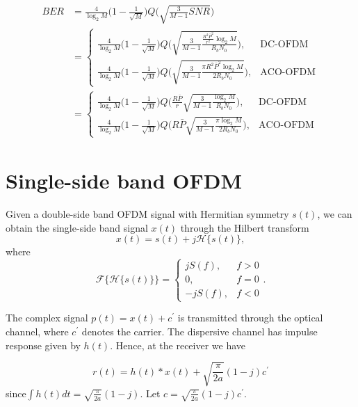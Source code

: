 \documentclass[a4paper]{article}
\begin{document}
\begin{align} \nonumber
BER &= \frac{4}{\log_2M}\bigg(1 - \frac{1}{\sqrt{M}}\bigg)Q\bigg(\sqrt{\frac{3}{M-1}SNR}\bigg) \\ 
& =\begin{cases}
\frac{4}{\log_2M}\bigg(1 - \frac{1}{\sqrt{M}}\bigg)Q\bigg(\sqrt{\frac{3}{M-1}\frac{\frac{R^2\bar{P}^2}{r^2}\log_2M}{R_bN_0}}\bigg), &\text{DC-OFDM} \\
\frac{4}{\log_2M}\bigg(1 - \frac{1}{\sqrt{M}}\bigg)Q\bigg(\sqrt{\frac{3}{M-1}\frac{\pi R^2\bar{P}^2\log_2M}{2R_bN_0}}\bigg), &\text{ACO-OFDM}
\end{cases} \\
& =\begin{cases}
\frac{4}{\log_2M}\bigg(1 - \frac{1}{\sqrt{M}}\bigg)Q\bigg(\frac{R\bar{P}}{r}\sqrt{\frac{3}{M-1}\frac{\log_2M}{R_bN_0}}\bigg), &\text{DC-OFDM} \\
\frac{4}{\log_2M}\bigg(1 - \frac{1}{\sqrt{M}}\bigg)Q\bigg(R\bar{P}\sqrt{\frac{3}{M-1}\frac{\pi\log_2M}{2R_bN_0}}\bigg), &\text{ACO-OFDM}
\end{cases}
\end{align}

\section{Single-side band OFDM}

Given a double-side band OFDM signal with Hermitian symmetry $s(t)$, we can obtain the single-side band signal $x(t)$ through the Hilbert transform
\begin{equation}
x(t) = s(t) + j\mathcal{H}\{s(t)\},
\end{equation}
where
\begin{equation}
\mathcal{F}\big\{\mathcal{H}\{s(t)\}\big\} = \begin{cases}
jS(f), & f > 0 \\
0, & f = 0 \\
-jS(f), & f < 0
\end{cases}.
\end{equation}

The complex signal $p(t) = x(t) + c^\prime$ is transmitted through the optical channel, where $c^\prime$ denotes the carrier. The dispersive channel has impulse response given by $h(t)$. Hence, at the receiver we have

\begin{equation}
r(t) = h(t)\ast x(t) + \sqrt{\frac{\pi}{2a}}(1-j)c^\prime 
\end{equation}
since$\int h(t)dt = \sqrt{\frac{\pi}{2a}}(1 - j)$. Let $c = \sqrt{\frac{\pi}{2a}}(1-j)c^\prime$.
\end{document}
